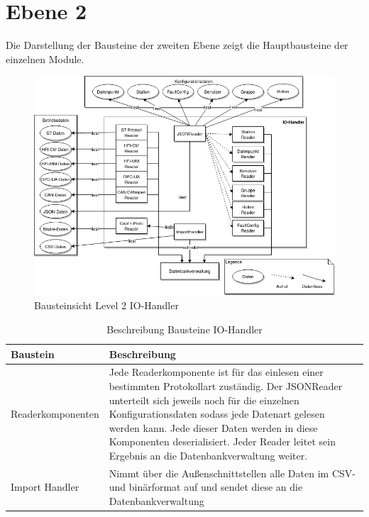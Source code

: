 \section{Ebene 2}
Die Darstellung der Bausteine der zweiten Ebene zeigt die Hauptbausteine der einzelnen Module.
\begin{figure}[h]
	\centering
	\includegraphics[width=1\textwidth]{Graphics/bausteinansicht_ebene_2_IO-Modul.png}
	\caption{Bausteinsicht Level 2 IO-Handler}
	\label{fig:bausteinsichtlvl2_modulIO}
\end{figure}                 

\begin{table}[t]
	\begin{tabularx}{\textwidth}{|p{5cm}| X|}
		\hline
		Baustein & Beschreibung\\
		\hline
		Readerkomponenten & Jede Readerkomponente ist für das einlesen einer bestimmten Protokollart zuständig. Der JSONReader unterteilt sich jeweils noch für die einzelnen Konfigurationsdaten sodass jede Datenart gelesen werden kann. Jede dieser Daten werden in diese Komponenten deserialisiert. Jeder Reader leitet sein Ergebnis an die Datenbankverwaltung weiter. \\
		\hline
		Import Handler &  Nimmt über die Außenschnittstellen alle Daten im CSV- und binärformat auf und sendet diese an die Datenbankverwaltung\\
		\hline
	\end{tabularx} 
	\caption{Beschreibung Bausteine IO-Handler}	\label{tab:IOHandlerBeschreibung}
\end{table}


